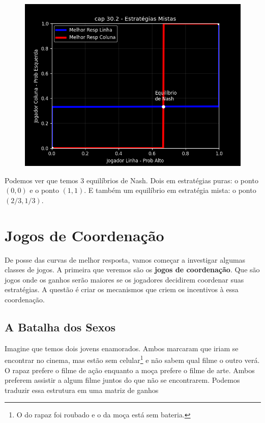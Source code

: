 \documentclass[a4paper,11pt,oneside]{book}
\theoremstyle{definition}
\theoremstyle{break}
\begin{document}
\begin{figure}[H]
\centering
\includegraphics[scale=0.75]{cap30_2-estrategias_mistas.png}
\end{figure}

Podemos ver que temos 3 equilíbrios de Nash. Dois em estratégias puras: o ponto $(0,0)$ e o ponto $(1,1)$. E também um equilíbrio em estratégia mista: o ponto $(2/3,1/3)$.

\section{Jogos de Coordenação}

De posse das curvas de melhor resposta, vamos começar a investigar algumas classes de jogos. A primeira que veremos são os \textbf{jogos de coordenação}. Que são jogos onde os ganhos serão maiores se os jogadores decidirem coordenar suas estratégias. A questão é criar os mecanismos que criem os incentivos à essa coordenação.

\subsection{A Batalha dos Sexos}

Imagine que temos dois jovens enamorados. Ambos marcaram que iriam se encontrar no cinema, mas estão sem celular\footnote{O do rapaz foi roubado e o da moça está sem bateria.} e não sabem qual filme o outro verá. O rapaz prefere o filme de ação enquanto a moça prefere o filme de arte. Ambos preferem assistir a algum filme juntos do que não se encontrarem. Podemos traduzir essa estrutura em uma matriz de ganhos
\end{document}
